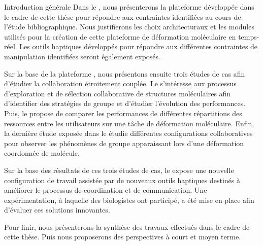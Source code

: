 \documentclass[myfrancais,ngerman,english,french]{mythesis}
\begin{document}
\begin{mychapter+}{Introduction générale}
		Dans le , nous présenterons la plateforme \myShaddock développée dans le cadre de cette thèse pour répondre aux contraintes identifiées au cours de l'étude bibliographique.
		Nous justifierons les choix architecturaux et les modules utilisés pour la création de cette plateforme de déformation moléculaire en temps-réel.
		Les outils haptiques développés pour répondre aux différentes contraintes de manipulation identifiées seront également exposés.

		Sur la base de la plateforme \myShaddock, nous présentons ensuite trois études de cas afin d'étudier la collaboration étroitement couplée.
		Le  s'intéresse aux processus d'exploration et de sélection collaborative de structures moléculaires afin d'identifier des stratégies de groupe et d'étudier l'évolution des performances.
		Puis, le  propose de comparer les performances de différentes répartitions des ressources entre les utilisateurs sur une tâche de déformation moléculaire.
		Enfin, la dernière étude exposée dans le  étudie différentes configurations collaboratives pour observer les phénomènes de groupe apparaissant lors d'une déformation coordonnée de molécule.

		Sur la base des résultats de ces trois études de cas, le  expose une nouvelle configuration de travail assistée par de nouveaux outils haptiques destinés à améliorer le processus de coordination et de communication.
		Une expérimentation, à laquelle des biologistes ont participé, a été mise en place afin d'évaluer ces solutions innovantes.

		Pour finir, nous présenterons la synthèse des travaux effectués dans le cadre de cette thèse.
		Puis nous proposerons des perspectives à court et moyen terme.
	\end{mychapter+}
\end{document}
